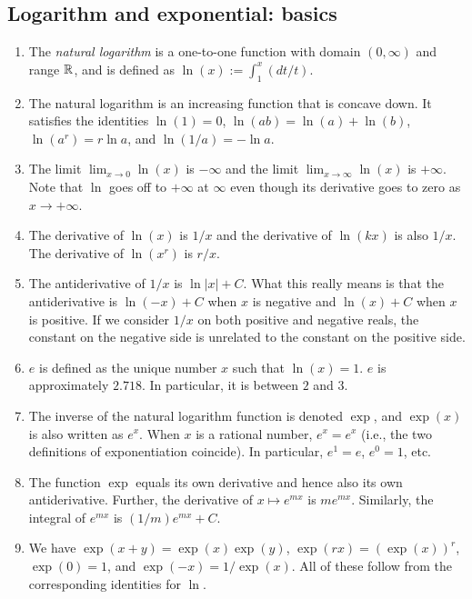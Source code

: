 \documentclass[10pt]{amsart}
\begin{document}
\subsection{Logarithm and exponential: basics}

\begin{enumerate}
\item The {\em natural logarithm} is a one-to-one function with domain
  $(0,\infty)$ and range $\mathbb{R}$, and is defined as $\ln(x) := \int_1^x
  (dt/t)$.
\item The natural logarithm is an increasing function that is concave
  down. It satisfies the identities $\ln(1) = 0$, $\ln(ab) = \ln(a) +
  \ln(b)$, $\ln(a^r) = r\ln a$, and $\ln(1/a) = -\ln a$.
\item The limit $\lim_{x \to 0} \ln(x)$ is $-\infty$ and the limit
  $\lim_{x \to \infty} \ln(x)$ is $+\infty$. Note that $\ln$ goes off
  to $+\infty$ at $\infty$ even though its derivative goes to zero as
  $x \to + \infty$.
\item The derivative of $\ln(x)$ is $1/x$ and the derivative
  of $\ln(kx)$ is also $1/x$. The derivative of $\ln(x^r)$
  is $r/x$.
\item The antiderivative of $1/x$ is $\ln |x| + C$. What this really
  means is that the antiderivative is $\ln(-x) + C$ when $x$ is
  negative and $\ln(x) + C$ when $x$ is positive. If we consider $1/x$
  on both positive and negative reals, the constant on the negative
  side is unrelated to the constant on the positive side.
\item $e$ is defined as the unique number $x$ such that $\ln(x) =
  1$. $e$ is approximately $2.718$. In particular, it is between $2$ and
  $3$.
\item The inverse of the natural logarithm function is denoted $\exp$,
  and $\exp(x)$ is also written as $e^x$. When $x$ is a rational
  number, $e^x = e^x$ (i.e., the two definitions of exponentiation
  coincide). In particular, $e^1 = e$, $e^0 = 1$, etc.
\item The function $\exp$ equals its own derivative and hence also its
  own antiderivative. Further, the derivative of $x \mapsto e^{mx}$ is
  $me^{mx}$. Similarly, the integral of $e^{mx}$ is $(1/m)e^{mx} +C$.
\item We have $\exp(x + y) = \exp(x)\exp(y)$, $\exp(rx) =
  (\exp(x))^r$, $\exp(0) = 1$, and $\exp(-x) = 1/\exp(x)$. All of
  these follow from the corresponding identities for $\ln$.
\end{enumerate}
\end{document}
